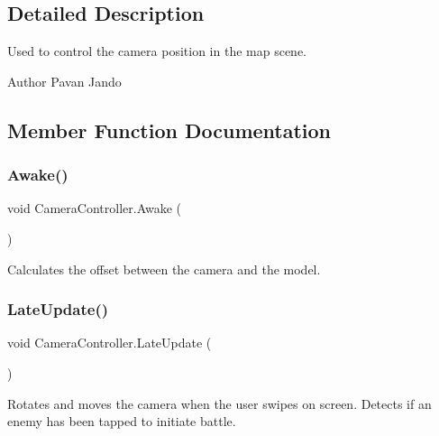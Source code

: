 \subsection{Detailed Description}
Used to control the camera position in the map scene. 

\begin{DoxyAuthor}{Author}
Pavan Jando
\end{DoxyAuthor}


\subsection{Member Function Documentation}
\mbox{\label{class_camera_controller_a266b0fde6845020de831bbd9bbcbc6a9}} 
\subsubsection{\texorpdfstring{Awake()}{Awake()}}
{\footnotesize\ttfamily void Camera\+Controller.\+Awake (\begin{DoxyParamCaption}{ }\end{DoxyParamCaption})\hspace{0.3cm}{\ttfamily [private]}}



Calculates the offset between the camera and the model. 

\mbox{\label{class_camera_controller_afcd241727886518c21b9609193e32d18}} 
\subsubsection{\texorpdfstring{LateUpdate()}{LateUpdate()}}
{\footnotesize\ttfamily void Camera\+Controller.\+Late\+Update (\begin{DoxyParamCaption}{ }\end{DoxyParamCaption})\hspace{0.3cm}{\ttfamily [private]}}



Rotates and moves the camera when the user swipes on screen. Detects if an enemy has been tapped to initiate battle. 



